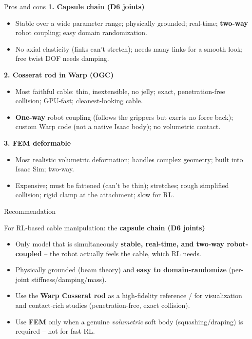 \documentclass[aspectratio=169]{beamer}
\begin{document}
\begin{frame}{Pros and cons}
  \footnotesize
  \textbf{1. Capsule chain (D6 joints)}
  \begin{itemize}\itemsep1pt
    \item[\textcolor{green!50!black}{+}] Stable over a wide parameter range; physically grounded; real-time; \textbf{two-way} robot coupling; easy domain randomization.
    \item[\textcolor{red!70!black}{--}] No axial elasticity (links can't stretch); needs many links for a smooth look; free twist DOF needs damping.
  \end{itemize}
  \textbf{2. Cosserat rod in Warp (OGC)}
  \begin{itemize}\itemsep1pt
    \item[\textcolor{green!50!black}{+}] Most faithful cable: thin, inextensible, no jelly; exact, penetration-free collision; GPU-fast; cleanest-looking cable.
    \item[\textcolor{red!70!black}{--}] \textbf{One-way} robot coupling (follows the grippers but exerts no force back); custom Warp code (not a native Isaac body); no volumetric contact.
  \end{itemize}
  \textbf{3. FEM deformable}
  \begin{itemize}\itemsep1pt
    \item[\textcolor{green!50!black}{+}] Most realistic volumetric deformation; handles complex geometry; built into Isaac Sim; two-way.
    \item[\textcolor{red!70!black}{--}] Expensive; must be fattened (can't be thin); stretches; rough simplified collision; rigid clamp at the attachment; slow for RL.
  \end{itemize}
\end{frame}

\begin{frame}{Recommendation}
  \begin{block}{For RL-based cable manipulation: the \textbf{capsule chain (D6 joints)}}
  \begin{itemize}\footnotesize
    \item Only model that is simultaneously \textbf{stable, real-time, and two-way
          robot-coupled} -- the robot actually feels the cable, which RL needs.
    \item Physically grounded (beam theory) and \textbf{easy to domain-randomize}
          (per-joint stiffness/damping/mass).
  \end{itemize}
  \end{block}
  \begin{itemize}\footnotesize
    \item Use the \textbf{Warp Cosserat rod} as a high-fidelity reference / for
          visualization and contact-rich studies (penetration-free, exact collision).
    \item Use \textbf{FEM} only when a genuine \emph{volumetric} soft body
          (squashing/draping) is required -- not for fast RL.
  \end{itemize}
\end{frame}
\end{document}
